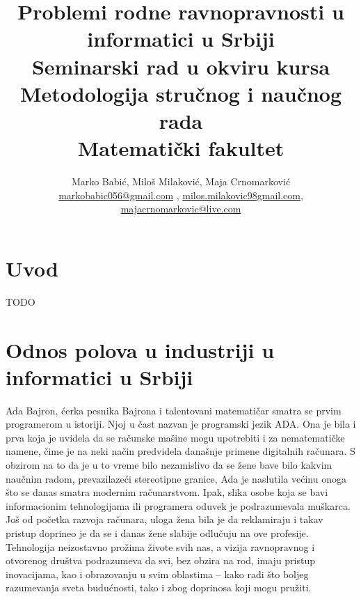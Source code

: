 \documentclass[a4paper]{article}
\begin{document}
\title{Problemi rodne ravnopravnosti u informatici u Srbiji\\
\vspace{5mm}
\small{Seminarski rad u okviru kursa\\Metodologija stručnog i naučnog rada\\ Matematički fakultet}}

\author{Marko Babić, Miloš Milaković,  Maja Crnomarković\\ \href{mailto:markobabic056@gmail.com}{markobabic056@gmail.com} , \href{mailto:milos.milakovic98@gmail.com}{milos.milakovic98gmail.com}, \href{mailto:majacrnomarkovic@live.com}{majacrnomarkovic@live.com}}

\maketitle


\tableofcontents

\newpage

\section{Uvod}
\label{sec:uvod}

TODO

\section{Odnos polova u industriji u informatici u Srbiji}
Ada Bajron, ćerka pesnika Bajrona i talentovani matematičar smatra se prvim programerom u istoriji. Njoj u čast nazvan je programski jezik ADA. Ona je bila i prva koja je uvidela da se računske mašine mogu upotrebiti i za nematematičke namene,
čime je na neki način predvidela današnje primene digitalnih računara. S obzirom na to da je u to vreme bilo nezamislivo da se žene bave bilo kakvim naučnim radom, prevazilazeći stereotipne granice, Ada je naslutila većinu onoga što se danas smatra modernim računarstvom.
Ipak, slika osobe koja se bavi informacionim tehnologijama ili programera oduvek je podrazumevala muškarca. Još od početka razvoja računara, uloga žena bila je da reklamiraju    i takav pristup doprineo je da se i danas žene slabije odlučuju na ove profesije. Tehnologija neizostavno prožima živote svih nas, a vizija ravnopravnog i otvorenog društva podrazumeva da svi, bez obzira na rod, imaju pristup inovacijama, kao i obrazovanju u svim oblastima – kako radi što boljeg razumevanja sveta budućnosti, tako i zbog doprinosa koji mogu pružiti.
\end{document}
